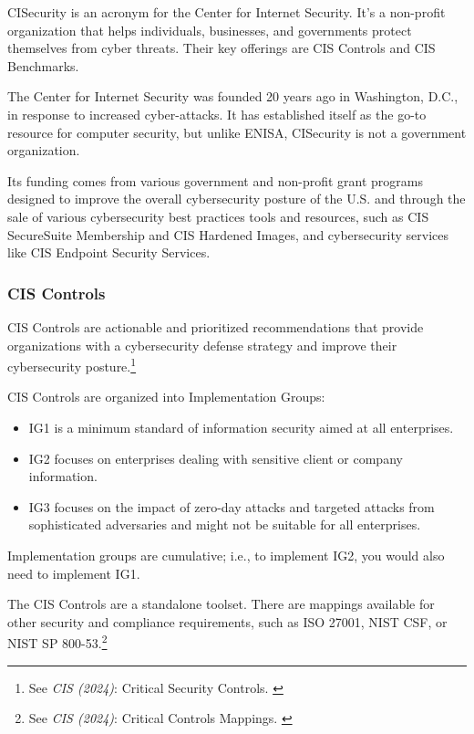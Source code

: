 CISecurity is an acronym for the Center for Internet Security. It's a non-profit organization that helps individuals, businesses, and governments protect themselves from cyber threats. Their key offerings are CIS Controls and CIS Benchmarks.

The Center for Internet Security was founded 20 years ago in Washington, D.C., in response to increased cyber-attacks. It has established itself as the go-to resource for computer security, but unlike ENISA, CISecurity is not a government organization.

Its funding comes from various government and non-profit grant programs designed to improve the overall cybersecurity posture of the U.S. and through the sale of various cybersecurity best practices tools and resources, such as CIS SecureSuite Membership and CIS Hardened Images, and cybersecurity services like CIS Endpoint Security Services.

\subsubsection{CIS Controls}

CIS Controls are actionable and prioritized recommendations that provide organizations with a cybersecurity defense strategy and improve their cybersecurity posture.\footnote{See \textit{CIS (2024)}: Critical Security Controls. \cite{cisControls}}

CIS Controls are organized into Implementation Groups:

\begin{itemize}
    \item IG1 is a minimum standard of information security aimed at all enterprises.
    \item IG2 focuses on enterprises dealing with sensitive client or company information.
    \item IG3 focuses on the impact of zero-day attacks and targeted attacks from sophisticated adversaries and might not be suitable for all enterprises.
\end{itemize}

Implementation groups are cumulative; i.e., to implement IG2, you would also need to implement IG1.

The CIS Controls are a standalone toolset. There are mappings available for other security and compliance requirements, such as ISO 27001, NIST CSF, or NIST SP 800-53.\footnote{See \textit{CIS (2024)}: Critical Controls Mappings. \cite{cisMappings}}

